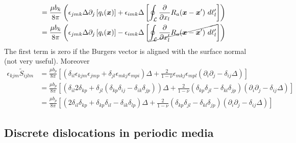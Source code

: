 {\begin{align}
&=\frac{\mu b_k}{8\pi}\left(\epsilon_{jmk}\Delta\partial_j \left[q_i(\bm x)\right]+\epsilon_{imk}\Delta \left[\oint_\mathcal{L} \frac{\partial}{\partial x_l} R_a(\bm x-\bm x')\ d\ell'_l\right]\right)\nonumber\\
&=\frac{\mu b_k}{8\pi}\left(\epsilon_{jmk}\Delta\partial_j \left[q_i(\bm x)\right]-\epsilon_{imk}\Delta \left[\cancel{\oint_\mathcal{L} \frac{\partial}{\partial x'_l} R_a(\bm x-\bm x')\ d\ell'_l}\right]\right)\nonumber
\end{align}
The first term is zero if the Burgers vector is aligned with the surface normal (not very useful).
Moreover
\begin{align}
\epsilon_{kjm}\tilde{S}_{ijlm}
&=\frac{\mu b_p}{8\pi}\left[\left(\delta_{il}\epsilon_{kjm}\epsilon_{jmp}+\delta_{jl}\epsilon_{mkj}\epsilon_{mpi}\right)\Delta+\frac{2}{1-\nu}\epsilon_{mkj}\epsilon_{mpl}\left(\partial_{i}\partial_j-\delta_{ij}\Delta\right)\right]\nonumber\\
&=\frac{\mu b_p}{8\pi}\left[\left(\delta_{il}2\delta_{kp}+\delta_{jl}\left(\delta_{kp}\delta_{ij}-\delta_{ik}\delta_{jp}\right)\right)\Delta+\frac{2}{1-\nu}\left(\delta_{kp}\delta_{jl}-\delta_{kl}\delta_{jp}\right)\left(\partial_{i}\partial_j-\delta_{ij}\Delta\right)\right]\nonumber\\
&=\frac{\mu b_p}{8\pi}\left[\left(2\delta_{il}\delta_{kp}+\delta_{kp}\delta_{il}-\delta_{ik}\delta_{lp}\right)\Delta+\frac{2}{1-\nu}\left(\delta_{kp}\delta_{jl}-\delta_{kl}\delta_{jp}\right)\left(\partial_{i}\partial_j-\delta_{ij}\Delta\right)\right]
\end{align}
}




\subsection{Discrete dislocations in periodic media}